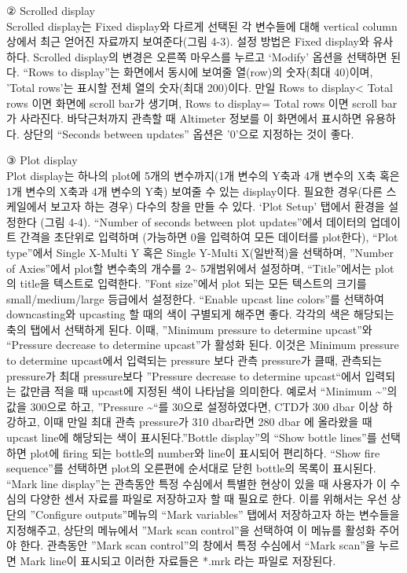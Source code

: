 \documentclass[
]{book}
\begin{document}
② Scrolled display\\
Scrolled display는 Fixed display와 다르게 선택된 각 변수들에 대해 vertical column 상에서 최근 얻어진 자료까지 보여준다(그림 4-3). 설정 방법은 Fixed display와 유사하다. Scrolled display의 변경은 오른쪽 마우스를 누르고 `Modify' 옵션을 선택하면 된다. ``Rows to display''는 화면에서 동시에 보여줄 열(row)의 숫자(최대 40)이며, 'Total rows'는 표시할 전체 열의 숫자(최대 200)이다. 만일 Rows to display\textless{} Total rows 이면 화면에 scroll bar가 생기며, Rows to display= Total rows 이면 scroll bar가 사라진다. 바닥근처까지 관측할 때 Altimeter 정보를 이 화면에서 표시하면 유용하다. 상단의 ``Seconds between updates'' 옵션은 '0'으로 지정하는 것이 좋다.

③ Plot display\\
Plot display는 하나의 plot에 5개의 변수까지(1개 변수의 Y축과 4개 변수의 X축 혹은 1개 변수의 X축과 4개 변수의 Y축) 보여줄 수 있는 display이다. 필요한 경우(다른 스케일에서 보고자 하는 경우) 다수의 창을 만들 수 있다. `Plot Setup' 탭에서 환경을 설정한다 (그림 4-4). ``Number of seconds between plot updates''에서 데이터의 업데이트 간격을 초단위로 입력하며 (가능하면 0을 입력하여 모든 데이터를 plot한다), ``Plot type''에서 Single X-Multi Y 혹은 Single Y-Multi X(일반적)을 선택하며, ''Number of Axies''에서 plot할 변수축의 개수를 2\textasciitilde{} 5개범위에서 설정하며, ``Title''에서는 plot 의 title을 텍스트로 입력한다. ''Font size''에서 plot 되는 모든 텍스트의 크기를 small/medium/large 등급에서 설정한다.
``Enable upcast line colors''를 선택하여 downcasting와 upcasting 할 때의 색이 구별되게 해주면 좋다. 각각의 색은 해당되는 축의 탭에서 선택하게 된다. 이때, ''Minimum pressure to determine upcast''와 ``Pressure decrease to determine upcast''가 활성화 된다. 이것은 Minimum pressure to determine upcast에서 입력되는 pressure 보다 관측 pressure가 클때, 관측되는 pressure가 최대 pressure보다 ''Pressure decrease to determine upcast``에서 입력되는 값만큼 적을 때 upcast에 지정된 색이 나타남을 의미한다. 예로서 ``Minimum \textasciitilde{}''의 값을 300으로 하고, ''Pressure \textasciitilde{}``를 30으로 설정하였다면, CTD가 300 dbar 이상 하강하고, 이때 만일 최대 관측 pressure가 310 dbar라면 280 dbar 에 올라왔을 때 upcast line에 해당되는 색이 표시된다.''Bottle display''의 ``Show bottle lines''를 선택하면 plot에 firing 되는 bottle의 number와 line이 표시되어 편리하다. ``Show fire sequence''를 선택하면 plot의 오른편에 순서대로 닫힌 bottle의 목록이 표시된다.
``Mark line display''는 관측동안 특정 수심에서 특별한 현상이 있을 때 사용자가 이 수심의 다양한 센서 자료를 파일로 저장하고자 할 때 필요로 한다. 이를 위해서는 우선 상단의 ''Configure outputs''메뉴의 ``Mark variables'' 탭에서 저장하고자 하는 변수들을 지정해주고, 상단의 메뉴에서 ''Mark scan control''을 선택하여 이 메뉴를 활성화 주어야 한다. 관측동안 ''Mark scan control''의 창에서 특정 수심에서 ``Mark scan''을 누르면 Mark line이 표시되고 이러한 자료들은 *.mrk 라는 파일로 저장된다.
\end{document}
